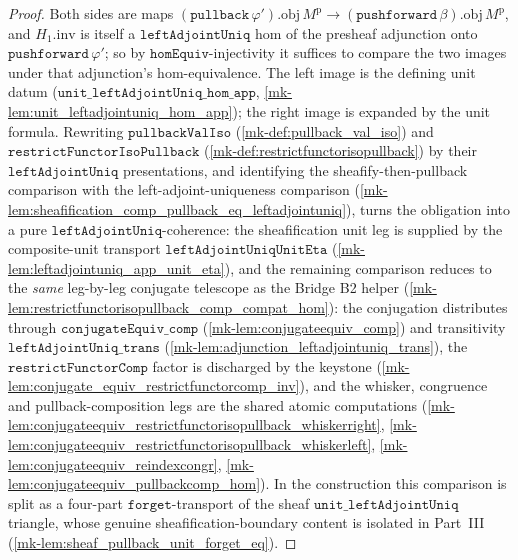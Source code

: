 \begin{proof}
  \leanok
    Both sides are maps \((\mathtt{pullback}\,\varphi').\mathrm{obj}\,M^{\mathrm p} \to
  (\mathtt{pushforward}\,\beta).\mathrm{obj}\,M^{\mathrm p}\), and \(H_1.\mathrm{inv}\) is itself a
  \(\mathtt{leftAdjointUniq}\) hom of the presheaf adjunction onto \(\mathtt{pushforward}\,\varphi'\);
  so by \(\mathtt{homEquiv}\)-injectivity it suffices to compare the two images under that adjunction's
  hom-equivalence. The left image is the defining unit datum
  (\(\mathtt{unit\_leftAdjointUniq\_hom\_app}\), \ref{mk-lem:unit_leftadjointuniq_hom_app}); the right image
  is expanded by the unit formula. Rewriting \(\mathtt{pullbackValIso}\)
  (\ref{mk-def:pullback_val_iso}) and \(\mathtt{restrictFunctorIsoPullback}\)
  (\ref{mk-def:restrictfunctorisopullback}) by their \(\mathtt{leftAdjointUniq}\) presentations, and
  identifying the sheafify-then-pullback comparison with the left-adjoint-uniqueness comparison
  (\ref{mk-lem:sheafification_comp_pullback_eq_leftadjointuniq}), turns the obligation into a pure
  \(\mathtt{leftAdjointUniq}\)-coherence: the sheafification unit leg is supplied by the composite-unit
  transport \(\mathtt{leftAdjointUniqUnitEta}\) (\ref{mk-lem:leftadjointuniq_app_unit_eta}), and the
  remaining comparison reduces to the \emph{same} leg-by-leg conjugate telescope as the Bridge B2
  helper (\ref{mk-lem:restrictfunctorisopullback_comp_compat_hom}): the conjugation distributes through
  \(\mathtt{conjugateEquiv\_comp}\) (\ref{mk-lem:conjugateequiv_comp}) and transitivity
  \(\mathtt{leftAdjointUniq\_trans}\) (\ref{mk-lem:adjunction_leftadjointuniq_trans}), the
  \(\mathtt{restrictFunctorComp}\) factor is discharged by the keystone
  (\ref{mk-lem:conjugate_equiv_restrictfunctorcomp_inv}), and the whisker, congruence and
  pullback-composition legs are the shared atomic computations
  (\ref{mk-lem:conjugateequiv_restrictfunctorisopullback_whiskerright},
  \ref{mk-lem:conjugateequiv_restrictfunctorisopullback_whiskerleft},
  \ref{mk-lem:conjugateequiv_reindexcongr}, \ref{mk-lem:conjugateequiv_pullbackcomp_hom}).
  In the construction this comparison is split as a four-part \(\mathtt{forget}\)-transport
  of the sheaf \(\mathtt{unit\_leftAdjointUniq}\) triangle, whose genuine sheafification-boundary
  content is isolated in Part~III (\ref{mk-lem:sheaf_pullback_unit_forget_eq}).
\end{proof}

